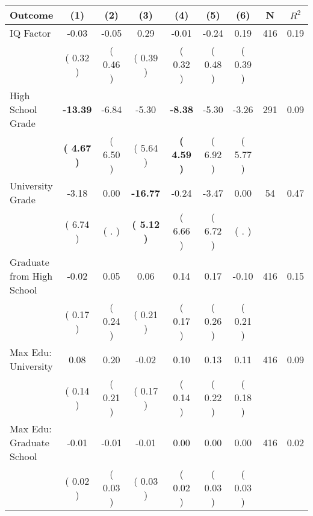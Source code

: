\begin{tabular}{lcccccccc}
\toprule
 \textbf{Outcome} & \textbf{(1)} & \textbf{(2)} & \textbf{(3)} & \textbf{(4)} & \textbf{(5)} & \textbf{(6)} & \textbf{N} & \textbf{$ R^2$} \\
\midrule
IQ Factor &     -0.03 &     -0.05 &      0.29 &     -0.01 &     -0.24 &      0.19 & 416 &       0.19 \\ 
 & (     0.32 ) & (     0.46 ) & (     0.39 ) & (     0.32 ) & (     0.48 ) & (     0.39 ) & \\
High School Grade & \textbf{   -13.39} &     -6.84 &     -5.30 & \textbf{    -8.38} &     -5.30 &     -3.26 & 291 &       0.09 \\ 
 & \textbf{(     4.67 )} & (     6.50 ) & (     5.64 ) & \textbf{(     4.59 )} & (     6.92 ) & (     5.77 ) & \\
University Grade &     -3.18 &      0.00 & \textbf{   -16.77} &     -0.24 &     -3.47 &      0.00 & 54 &       0.47 \\ 
 & (     6.74 ) & (        . ) & \textbf{(     5.12 )} & (     6.66 ) & (     6.72 ) & (        . ) & \\
Graduate from High School &     -0.02 &      0.05 &      0.06 &      0.14 &      0.17 &     -0.10 & 416 &       0.15 \\ 
 & (     0.17 ) & (     0.24 ) & (     0.21 ) & (     0.17 ) & (     0.26 ) & (     0.21 ) & \\
Max Edu: University &      0.08 &      0.20 &     -0.02 &      0.10 &      0.13 &      0.11 & 416 &       0.09 \\ 
 & (     0.14 ) & (     0.21 ) & (     0.17 ) & (     0.14 ) & (     0.22 ) & (     0.18 ) & \\
Max Edu: Graduate School &     -0.01 &     -0.01 &     -0.01 &      0.00 &      0.00 &      0.00 & 416 &       0.02 \\ 
 & (     0.02 ) & (     0.03 ) & (     0.03 ) & (     0.02 ) & (     0.03 ) & (     0.03 ) & \\
\bottomrule
\end{tabular}

